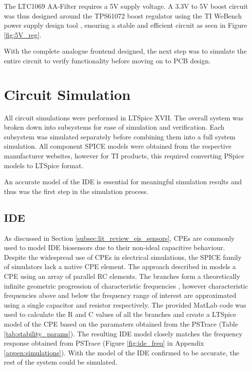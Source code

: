 The LTC1069 AA-Filter requires a 5V supply voltage. A 3.3V to 5V boost circuit was thus designed around the TPS61072 boost regulator using the TI WeBench power supply design tool \cite{WEBENCHCIRCUITDESIGNERDesignTool}, ensuring a stable and efficient circuit as seen in Figure \ref{fig:5V_reg}. 

With the complete analogue frontend designed, the next step was to simulate the entire circuit to verify functionality before moving on to PCB design.

\section{Circuit Simulation}
All circuit simulations were performed in LTSpice XVII. The overall system was broken down into subsystems for ease of simulation and verification. Each subsystem was simulated separately before combining them into a full system simulation. All component SPICE models were obtained from the respective manufacturer websites, however for TI products, this required converting PSpice models to LTSpice format.

An accurate model of the \ac{IDE} is essential for meaningful simulation results and thus was the first step in the simulation process.
\subsection{IDE}
As discussed in Section \ref{subsec:lit_review_eis_sensors}, \acp{CPE} are commonly used to model \ac{IDE} biosensors due to their non-ideal capacitive behaviour. Despite the widespread use of \acp{CPE} in electrical simulations, the SPICE family of simulators lack a native CPE element. The approach described in \cite{wilsonSimulatingFractionalCapacitors2023} models a CPE using an array of parallel RC elements. The branches form a theoretically infinite geometric progression of characteristic frequencies \cite{wilsonSimulatingFractionalCapacitors2023}, however characteristic frequencies above and below the frequency range of interest are approximated using a single capacitor and resistor respectively. The provided MatLab code was used to calculate the R and C values of all the branches and create a LTSpice model of the CPE based on the paramaters obtained from the PSTrace (Table \ref{tab:stability_params}). The resulting IDE model closely matches the frequency response obtained from PSTrace (Figure \ref{fig:ide_freq} in Appendix \ref{appen:simulations}). With the model of the \ac{IDE} confirmed to be accurate, the rest of the system could be simulated.

